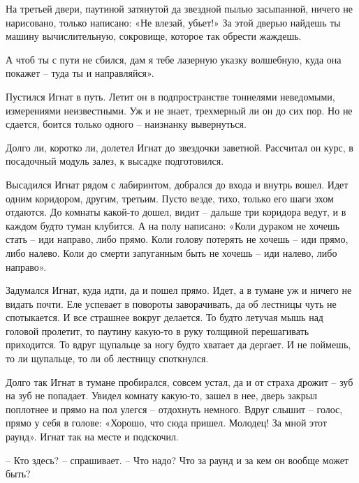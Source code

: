 \documentclass[ebook,oneside,final,openright]{memoir}
\begin{document}
\par
На третьей двери, паутиной затянутой да звездной пылью засыпанной, ничего не нарисовано, только написано: «Не влезай, убьет!» За этой дверью найдешь ты машину вычислительную, сокровище, которое так обрести жаждешь.\par
\par
А чтоб ты с пути не сбился, дам я тебе лазерную указку волшебную, куда она покажет – туда ты и направляйся».\par
\par
Пустился Игнат в путь. Летит он в подпространстве тоннелями неведомыми, измерениями неизвестными. Уж и не знает, трехмерный ли он до сих пор. Но не сдается, боится только одного – наизнанку вывернуться.\par
\par
Долго ли, коротко ли, долетел Игнат до звездочки заветной. Рассчитал он курс, в посадочный модуль залез, к высадке подготовился.\par
\par
Высадился Игнат рядом с лабиринтом, добрался до входа и внутрь вошел. Идет одним коридором, другим, третьим. Пусто везде, тихо, только его шаги эхом отдаются. До комнаты какой-то дошел, видит – дальше три коридора ведут, и в каждом будто туман клубится. А на полу написано: «Коли дураком не хочешь стать – иди направо, либо прямо. Коли голову потерять не хочешь – иди прямо, либо налево. Коли до смерти запуганным быть не хочешь – иди налево, либо направо».\par
\par
Задумался Игнат, куда идти, да и пошел прямо. Идет, а в тумане уж и ничего не видать почти. Еле успевает в повороты заворачивать, да об лестницы чуть не спотыкается. И все страшнее вокруг делается. То будто летучая мышь над головой пролетит, то паутину какую-то в руку толщиной перешагивать приходится. То вдруг щупальце за ногу будто хватает да дергает. И не поймешь, то ли щупальце, то ли об лестницу споткнулся.\par
\par
Долго так Игнат в тумане пробирался, совсем устал, да и от страха дрожит – зуб на зуб не попадает. Увидел комнату какую-то, зашел в нее, дверь закрыл поплотнее и прямо на пол улегся – отдохнуть немного. Вдруг слышит – голос, прямо у себя в голове: «Хорошо, что сюда пришел. Молодец! За мной этот раунд». Игнат так на месте и подскочил. \par
\par
– Кто здесь? – спрашивает. – Что надо? Что за раунд и за кем он вообще может быть?\par
\end{document}

